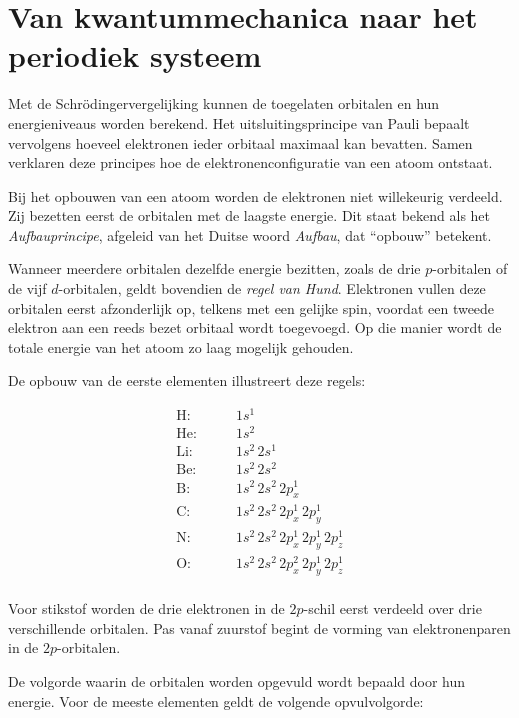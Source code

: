 \section{Van kwantummechanica naar het periodiek systeem}

Met de Schr\"odingervergelijking kunnen de toegelaten orbitalen en hun energieniveaus worden berekend. Het uitsluitingsprincipe van Pauli bepaalt vervolgens hoeveel elektronen ieder orbitaal maximaal kan bevatten. Samen verklaren deze principes hoe de elektronenconfiguratie van een atoom ontstaat.

Bij het opbouwen van een atoom worden de elektronen niet willekeurig verdeeld. Zij bezetten eerst de orbitalen met de laagste energie. Dit staat bekend als het \emph{Aufbauprincipe}, afgeleid van het Duitse woord \emph{Aufbau}, dat ``opbouw'' betekent.

Wanneer meerdere orbitalen dezelfde energie bezitten, zoals de drie $p$-orbitalen of de vijf $d$-orbitalen, geldt bovendien de \emph{regel van Hund}. Elektronen vullen deze orbitalen eerst afzonderlijk op, telkens met een gelijke spin, voordat een tweede elektron aan een reeds bezet orbitaal wordt toegevoegd. Op die manier wordt de totale energie van het atoom zo laag mogelijk gehouden.

De opbouw van de eerste elementen illustreert deze regels:

\begin{align*}
\text{H:}  &\qquad 1s^1 \\
\text{He:} &\qquad 1s^2 \\
\text{Li:} &\qquad 1s^2\,2s^1 \\
\text{Be:} &\qquad 1s^2\,2s^2 \\
\text{B:}  &\qquad 1s^2\,2s^2\,2p^1_x \\
\text{C:}  &\qquad 1s^2\,2s^2\,2p^1_x\, 2p^1_y \\
\text{N:}  &\qquad 1s^2\,2s^2\,2p^1_x\,2p^1_y\,2p^1_z \\
\text{O:}  &\qquad 1s^2\,2s^2\,2p^2_x\,2p^1_y\,2p^1_z \\
\end{align*}

Voor stikstof worden de drie elektronen in de $2p$-schil eerst verdeeld over drie verschillende orbitalen. Pas vanaf zuurstof begint de vorming van elektronenparen in de $2p$-orbitalen.

De volgorde waarin de orbitalen worden opgevuld wordt bepaald door hun energie. Voor de meeste elementen geldt de volgende opvulvolgorde:

